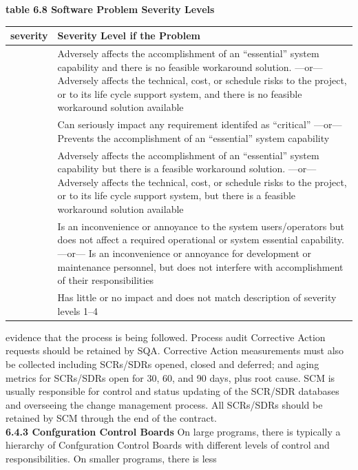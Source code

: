 \documentclass[twocolumn,a4paper,13pt]{book}
\begin{document}
	
	\begin{table}[h!]
	\textbf{table 6.8 Software Problem Severity Levels}
		\begin{tabular}{|p{1.5cm}|p{5.5cm}|}
			\toprule
			\textbf{severity}  & \textbf{Severity Level if the Problem}\\
			\midrule
			\ch{1} & Adversely affects the accomplishment of an
			“essential” system capability and there is no
			feasible workaround solution. —or—
			Adversely affects the technical, cost, or
			schedule risks to the project, or to its life
			cycle support system, and there is no feasible
			workaround solution available \\
			\hline\ch{2} & Can seriously impact any requirement
			identifed as “critical” —or—
			Prevents the accomplishment of an
			“essential” system capability \\
			\hline\ch{3} &Adversely affects the accomplishment of an
			“essential” system capability but there is a
			feasible workaround solution. —or—
			Adversely affects the technical, cost, or
			schedule risks to the project, or to its life
			cycle support system, but there is a feasible
			workaround solution available \\
			\hline\ch{4} & Is an inconvenience or annoyance to the
			system users/operators but does not affect a
			required operational or system essential
			capability. —or—
			Is an inconvenience or annoyance for
			development or maintenance personnel, but
			does not interfere with accomplishment of
			their responsibilities \\
			\hline \ch{5} & Has little or no impact and does not match
			description of severity levels 1–4 \\
			\bottomrule
		\end{tabular}
		
	\end{table}
evidence that the process is being followed. Process audit
Corrective Action requests should be retained by SQA.
Corrective Action measurements must also be collected
including SCRs/SDRs opened, closed and deferred; and
aging metrics for SCRs/SDRs open for 30, 60, and 90 days,
plus root cause. SCM is usually responsible for control and
status updating of the SCR/SDR databases and overseeing
the change management process. All SCRs/SDRs should be
retained by SCM through the end of the contract.\\
\textbf{6.4.3 Confguration Control Boards}
On large programs, there is typically a hierarchy of
Confguration Control Boards with diﬀerent levels of control and responsibilities. On smaller programs, there is less
\end{document}
